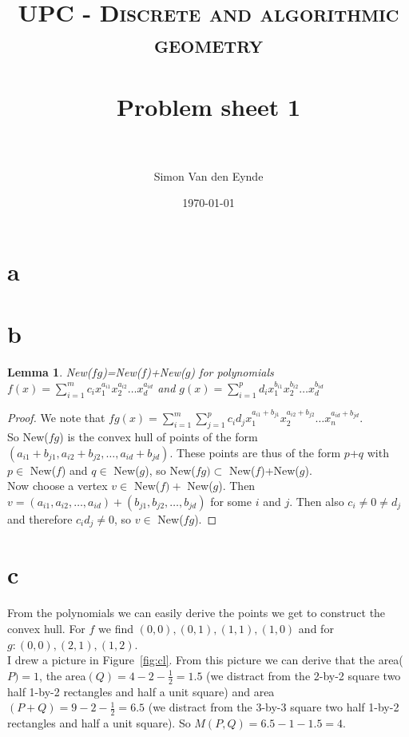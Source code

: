 \documentclass[paper=a4, fontsize=11pt]{scrartcl} %
\title{	
\normalfont \normalsize 
\textsc{UPC - Discrete and algorithmic geometry} \\ [25pt] %
\horrule{0.5pt} \\[0.4cm] %
\huge Problem sheet 1  \\ %
\horrule{2pt} \\[0.5cm] %
}
\author{Simon Van den Eynde} %
\date{\normalsize\today} %
\theoremstyle{plain}
\newtheorem{lemma}{Lemma}
\begin{document}
\maketitle %

\section{a}
\section{b}
\begin{lemma}
New($fg$)=New($f$)+New($g$) for polynomials $f(x)=\sum_{i=1}^{m}{c_{i}x_{1}^{a_{i1}}x_{2}^{a_{i2}}\ldots x_{d}^{a_{id}}}$ and $g(x)=\sum_{i=1}^{p}{d_{i}x_{1}^{b_{i1}}x_{2}^{b_{i2}}\ldots x_{d}^{b_{id}}}$
\end{lemma}
\begin{proof}
We note that $fg(x)=\sum_{i=1}^{m}\sum_{j=1}^{p}{c_{i}d_{j}x_{1}^{a_{i1}+b_{j1}}x_{2}^{a_{i2}+b_{j2}}\ldots x_{n}^{a_{id}+b_{jd}}}$.\\
So New($fg$) is the convex hull of points of the form $(a_{i1}+b_{j1},a_{i2}+b_{j2},\ldots,a_{id}+b_{jd})$.
These points are thus of the form $p$+$q$ with $p\in$ New($f$) and $q\in$ New($g$), so New($fg)\subset$ New($f$)+New($g$).\\

Now choose a vertex $v\in$ New($f) +$ New($g$). Then $v=(a_{i1},a_{i2},\ldots,a_{id}) + (b_{j1},b_{j2},\ldots,b_{jd})$ for some $i$ and $j$. Then also $c_{i}\neq 0 \neq d_{j}$ and therefore $c_{i}d_{j}\neq0$, so $v\in$ New($fg$).
\end{proof}

\section{c}
From the polynomials we can easily derive the points we get to construct the convex hull. For $f$ we find $(0,0),(0,1),(1,1),(1,0)$ and for $g:(0,0),(2,1),(1,2)$.\\
I drew a picture in Figure~\ref{fig:cl}. From this picture we can derive that the area($P)= 1$, the area$(Q) = 4-2-\frac{1}{2} = 1.5$ (we distract from the 2-by-2 square two half 1-by-2 rectangles and half a unit square) and area$(P+Q) = 9 - 2 -\frac{1}{2} = 6.5$ (we distract from the 3-by-3 square two half 1-by-2 rectangles and half a unit square).
So $M(P,Q) = 6.5-1-1.5 = 4$.
\end{document}
